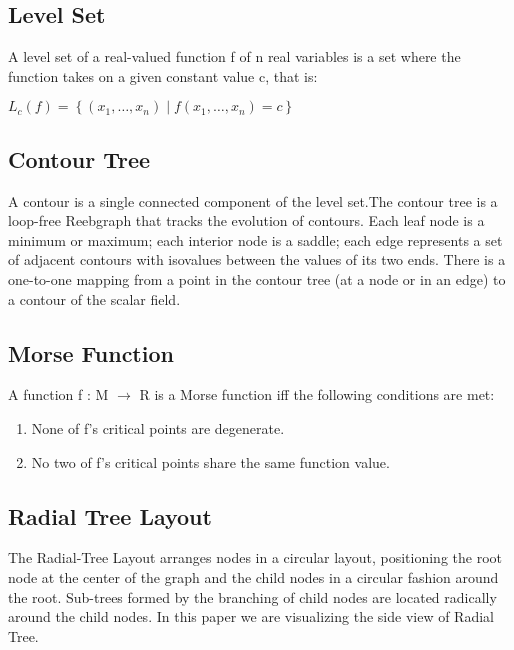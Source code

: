 \documentclass[a4paper]{article}
\begin{document}
\begin{multicols}{2}
\subsection{Level Set}
 A level set of a real-valued function f of n real variables is a set where the function takes on a given constant value c, that is:

${\displaystyle L_{c}(f)=\left\{(x_{1},\ldots ,x_{n})\mid f(x_{1},\ldots ,x_{n})=c\right\}~}$\\

\subsection{Contour Tree}
A contour is a single connected component of the level set.The contour tree \cite{CT} is a loop-free Reebgraph that tracks the evolution of contours. Each leaf node is a minimum or
maximum; each interior node is a saddle; each edge represents a set of adjacent contours with isovalues between the
values of its two ends. There is a one-to-one mapping from a point in the contour tree (at a node or in an edge) to a contour of the scalar field.

\subsection{Morse Function}
A function f : M $\rightarrow$ R is a Morse function iff the following conditions
are met:\\
\begin{enumerate}
    \item None of f’s critical points are degenerate.
    \item No two of f’s critical points share the same function value.
\end{enumerate}
   


\subsection{Radial Tree Layout}
The Radial-Tree Layout arranges nodes in a circular layout, positioning the root node at the center of the graph and the child nodes in a circular fashion around the root. Sub-trees formed by the branching of child nodes are located radically around the child nodes. In this paper we are visualizing the side view of Radial Tree.



\end{multicols}
\end{document}
